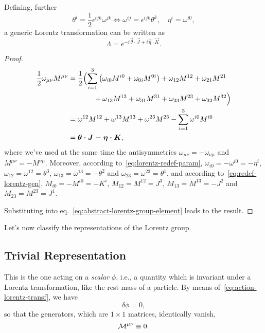 Defining, further
\begin{equation}\label{eq:lorentz-redef-param}
    \theta^i = \frac{1}{2} \epsilon^{ijk} \omega^{jk} \iff \omega^{ij} = \epsilon^{ijk} \theta^k, \quad \eta^i = \omega^{i0} ,
\end{equation}
a generic Lorentz transformation can be written as
\begin{equation}
    \Lambda = e^{-i \vec{\theta} \cdot \vec{J} + i \vec{\eta} \cdot \vec{K}} .
\end{equation}
\begin{proof}
    \begin{equation*}
    \begin{split}
        \frac{1}{2} \omega_{\mu\nu} M^{\mu\nu} &= \frac{1}{2} \Bigl( \sum_{i=1}^3 \left( \omega_{i0} M^{i0} + \omega_{0i} M^{0i} \right) + \omega_{12} M^{12} + \omega_{21} M^{21} \\
        &\qquad \quad \; \; + \omega_{13} M^{13} + \omega_{31} M^{31} + \omega_{23} M^{23} + \omega_{32} M^{32} \Bigr) \\
        &= \omega^{12} M^{12} + \omega^{13} M^{13} + \omega^{23} M^{23} - \sum_{i=1}^3 \omega^{i0} M^{i0} \\
        &= \vec{\vec{\theta} \cdot \vec{J} - \vec{\eta} \cdot \vec{K}},
    \end{split}
    \end{equation*}
    where we've used at the same time the antisymmetries $\omega_{\mu\nu} = - \omega_{\nu\mu}$ and $M^{\mu\nu}=- M^{\nu\mu}$. Moreover, according to~\eqref{eq:lorentz-redef-param}, $\omega_{i0} = -\omega^{i0}=-\eta^i$, $\omega_{12} = \omega^{12} = \theta^3$, $\omega_{13} = \omega^{13} = - \theta^2$ and $\omega_{23} = \omega^{23} = \theta^1$, and according to~\eqref{eq:redef-lorentz-gen}, $M_{i0} = -M^{i0}=- K^i$, $M_{12} = M^{12} = J^3$, $M_{13} = M^{13} = - J^2$ and $M_{23} = M^{23} = J^1$.

    Substituting into eq.~\eqref{eq:abstract-lorentz-group-element} leads to the result.
\end{proof}

Let's now classify the representations of the Lorentz group.


\subsection{Trivial Representation}
This is the one acting on a \emph{scalar} $\phi$, i.e., a quantity which is invariant under a Lorentz transformation, like the rest mass of a particle. By means of~\eqref{eq:action-lorentz-transf}, we have
\begin{equation}\label{eq:lorentz-transf-scalar}
    \delta \phi = 0,
\end{equation}
so that the generators, which are $1 \times 1$ matrices, identically vanish,
\begin{equation}
    \M^{\mu\nu} \equiv 0.
\end{equation}

